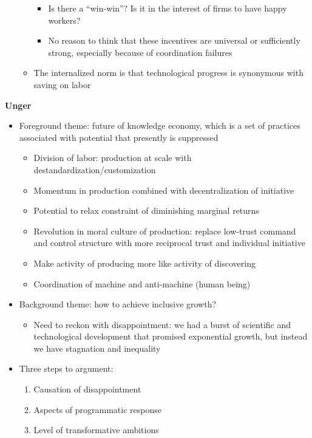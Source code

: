 \begin{itemize}
\begin{itemize}
    \begin{itemize}
    \tightlist
    \item
      Is there a ``win-win''? Is it in the interest of firms to have
      happy workers?
    \item
      No reason to think that these incentives are universal or
      sufficiently strong, especially because of coordination failures
    \end{itemize}
  \item
    The internalized norm is that technological progress is synonymous
    with saving on labor
  \end{itemize}
\end{itemize}

\textbf{Unger}

\begin{itemize}
\tightlist
\item
  Foreground theme: future of knowledge economy, which is a set of
  practices associated with potential that presently is suppressed

  \begin{itemize}
  \tightlist
  \item
    Division of labor: production at scale with
    destandardization/customization
  \item
    Momentum in production combined with decentralization of initiative
  \item
    Potential to relax constraint of diminishing marginal returns
  \item
    Revolution in moral culture of production: replace low-trust command
    and control structure with more reciprocal trust and individual
    initiative
  \item
    Make activity of producing more like activity of discovering
  \item
    Coordination of machine and anti-machine (human being)
  \end{itemize}
\item
  Background theme: how to achieve inclusive growth?

  \begin{itemize}
  \tightlist
  \item
    Need to reckon with disappointment: we had a burst of scientific and
    technological development that promised exponential growth, but
    instead we have stagnation and inequality
  \end{itemize}
\item
  Three steps to argument:

  \begin{enumerate}
  \def\labelenumi{\arabic{enumi}.}
  \tightlist
  \item
    Causation of disappointment
  \item
    Aspects of programmatic response
  \item
    Level of transformative ambitions
  \end{enumerate}
\end{itemize}


